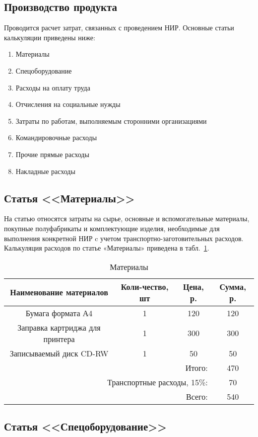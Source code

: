 \subsection{Производство продукта}

Проводится расчет затрат, связанных с проведением НИР. Основные статьи калькуляции приведены ниже:
\begin{enumerate}
\item Материалы
\item Спецоборудование
\item Расходы на оплату труда
\item Отчисления на социальные нужды
\item Затраты по работам, выполняемым сторонними организациями
\item Командировочные расходы
\item Прочие прямые расходы
\item Накладные расходы
\end{enumerate}

\subsection{Статья <<Материалы>>}

На статью относятся затраты на сырье, основные и вспомогательные материалы, покупные  полуфабрикаты
и комплектующие изделия, необходимые для выполнения конкретной НИР c учетом транспортно-заготовительных
расходов. Калькуляция расходов по статье «Материалы» приведена в табл.~\ref{tab:material}.

\begin{table}[ht]
\caption{Материалы}
\begin{tabular}{|c|c|c|c|}
\hline
Наименование материалов&Коли-чество, шт&Цена, р.&Сумма, р.\\
\hline
Бумага формата А4&1&120&120\\
\hline
Заправка картриджа для принтера&1&300&300\\
\hline
Записываемый диск CD-RW&1&50&50\\
\hline
\multicolumn{3}{|r|}{Итого:}&470\\
\hline
\multicolumn{3}{|r|}{Транспортные расходы, 15\%:}&70\\
\hline
\multicolumn{3}{|r|}{Всего:}&540\\
\hline
\end{tabular}
\label{tab:material}
\end{table}

\subsection{Статья <<Спецоборудование>>}


